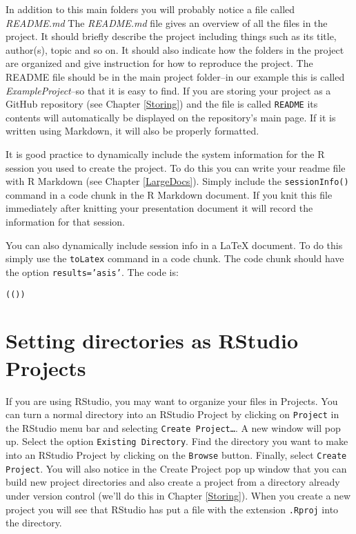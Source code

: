 {In addition to this main folders you will probably notice a file called {\emph{README.md}} The {\emph{README.md}} file gives an overview of all the files in the project. It should briefly describe the project including things such as its title, author(s), topic and so on. It should also indicate how the folders in the project are organized and give instruction for how to reproduce the project. The README file should be in the main project folder--in our example this is called {\emph{ExampleProject}}--so that it is easy to find. If you are storing your project as a GitHub repository (see Chapter \ref{Storing}) and the file is called \texttt{README} its contents will automatically be displayed on the repository's main page. If it is written using Markdown, it will also be properly formatted.

It is good practice to dynamically include the system information for the R session you used to create the project. To do this you can write your readme file with R Markdown (see Chapter \ref{LargeDocs}). Simply include the \texttt{sessionInfo()} command in a code chunk in the R Markdown document. If you knit this file immediately after knitting your presentation document it will record the information for that session.

\noindent You can also dynamically include session info in a LaTeX document. To do this simply use the {\tt{toLatex}} command in a code chunk. The code chunk should have the option \texttt{results='asis'}. The code is:

\begin{knitrout}
\color{fgcolor}\begin{kframe}
\begin{alltt}
(())
\end{alltt}
\end{kframe}
\end{knitrout}



\section{Setting directories as RStudio Projects}

If you are using RStudio, you may want to organize your files in Projects. You can turn a normal directory into an RStudio Project by clicking on \texttt{Project} in the RStudio menu bar and selecting \texttt{Create Project\ldots}. A new window will pop up. Select the option \texttt{Existing Directory}. Find the directory you want to make into an RStudio Project by clicking on the \texttt{Browse} button. Finally, select \texttt{Create Project}. You will also notice in the Create Project pop up window that you can build new project directories and also create a project from a directory already under version control (we'll do this in Chapter \ref{Storing}). When you create a new project you will see that RStudio has put a file with the extension \texttt{.Rproj} into the directory.

}
